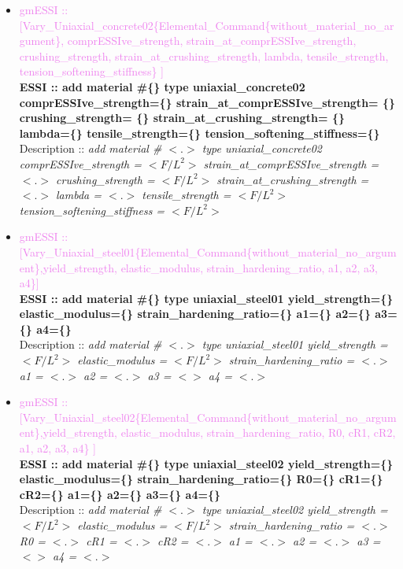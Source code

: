 \documentclass[11pt]{article}
\begin{document}
\begin{itemize}
    \item \textcolor{violet}{gmESSI :: [Vary\_Uniaxial\_concrete02\{Elemental\_Command\{without\_material\_no\_argument\}, comprESSIve\_strength, strain\_at\_comprESSIve\_strength, crushing\_strength, strain\_at\_crushing\_strength, lambda, tensile\_strength, tension\_softening\_stiffness\} ]}\\
    \textbf{ESSI :: add material \#\{\} type uniaxial\_concrete02 comprESSIve\_strength=\{\} strain\_at\_comprESSIve\_strength= \{\} crushing\_strength= \{\}  strain\_at\_crushing\_strength= \{\} lambda=\{\} tensile\_strength=\{\} tension\_softening\_stiffness=\{\}}\\
    Description ::  \textit{ add material \# $<.>$ type uniaxial\_concrete02 comprESSIve\_strength = $<F/L^2>$ strain\_at\_comprESSIve\_strength = $<.>$ crushing\_strength = $<F/L^2>$  strain\_at\_crushing\_strength = $<.>$ lambda = $<.>$ tensile\_strength = $<F/L^2>$ tension\_softening\_stiffness = $<F/L^2>$} 

    \item \textcolor{violet}{gmESSI :: [Vary\_Uniaxial\_steel01\{Elemental\_Command\{without\_material\_no\_argument\},yield\_strength, elastic\_modulus, strain\_hardening\_ratio, a1, a2, a3, a4\}]}\\
    \textbf{ESSI :: add material \#\{\} type uniaxial\_steel01 yield\_strength=\{\} elastic\_modulus=\{\} strain\_hardening\_ratio=\{\} a1=\{\} a2=\{\} a3=\{\} a4=\{\}}\\
    Description ::  \textit{ add material \# $<.>$ type uniaxial\_steel01 yield\_strength = $<F/L^2>$ elastic\_modulus = $<F/L^2>$ strain\_hardening\_ratio = $<.>$  a1 = $<.>$  a2 = $<.>$  a3 = $<>$  a4 = $<.>$ } 

    \item \textcolor{violet}{gmESSI :: [Vary\_Uniaxial\_steel02\{Elemental\_Command\{without\_material\_no\_argument\},yield\_strength, elastic\_modulus, strain\_hardening\_ratio, R0, cR1, cR2, a1, a2, a3, a4\} ]}\\
    \textbf{ESSI :: add material \#\{\} type uniaxial\_steel02 yield\_strength=\{\} elastic\_modulus=\{\} strain\_hardening\_ratio=\{\} R0=\{\} cR1=\{\} cR2=\{\} a1=\{\} a2=\{\} a3=\{\} a4=\{\}}\\
    Description ::  \textit{ add material \# $<.>$ type uniaxial\_steel02 yield\_strength = $<F/L^2>$ elastic\_modulus = $<F/L^2>$ strain\_hardening\_ratio = $<.>$ R0 = $<.>$ cR1 = $<.>$ cR2 = $<.>$  a1 = $<.>$  a2 = $<.>$  a3 = $<>$  a4 = $<.>$ } 


\end{itemize}
\end{document}
